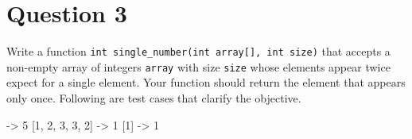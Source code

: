 
\section*{Question 3}

Write a function \texttt{int single\_number(int array[], int size)} that accepts a non-empty array of integers \texttt{array} with size \texttt{size} whose elements appear twice expect for a single element.
Your function should return the element that appears only once.
Following are test cases that clarify the objective.

\begin{terminal}
[1, -1, 4, 5, 4, 1, -1] -> 5
[1, 2, 3, 3, 2] -> 1
[1] -> 1
\end{terminal}
